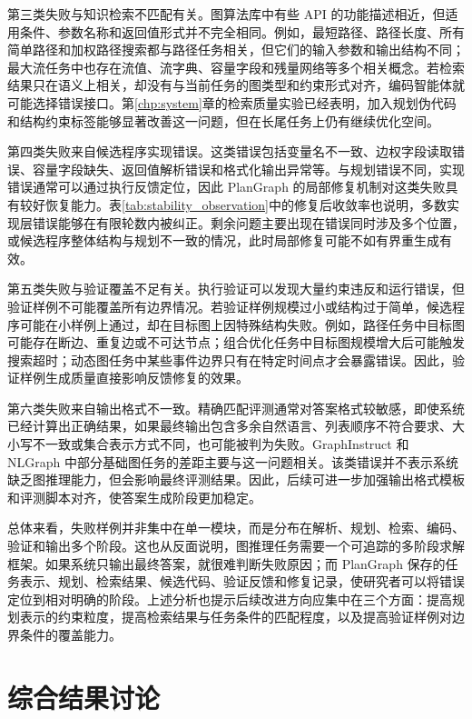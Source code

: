 第三类失败与知识检索不匹配有关。图算法库中有些 API 的功能描述相近，但适用条件、参数名称和返回值形式并不完全相同。例如，最短路径、路径长度、所有简单路径和加权路径搜索都与路径任务相关，但它们的输入参数和输出结构不同；最大流任务中也存在流值、流字典、容量字段和残量网络等多个相关概念。若检索结果只在语义上相关，却没有与当前任务的图类型和约束形式对齐，编码智能体就可能选择错误接口。第\ref{chp:system}章的检索质量实验已经表明，加入规划伪代码和结构约束标签能够显著改善这一问题，但在长尾任务上仍有继续优化空间。

第四类失败来自候选程序实现错误。这类错误包括变量名不一致、边权字段读取错误、容量字段缺失、返回值解析错误和格式化输出异常等。与规划错误不同，实现错误通常可以通过执行反馈定位，因此 PlanGraph 的局部修复机制对这类失败具有较好恢复能力。表\ref{tab:stability_observation}中的修复后收敛率也说明，多数实现层错误能够在有限轮数内被纠正。剩余问题主要出现在错误同时涉及多个位置，或候选程序整体结构与规划不一致的情况，此时局部修复可能不如有界重生成有效。

第五类失败与验证覆盖不足有关。执行验证可以发现大量约束违反和运行错误，但验证样例不可能覆盖所有边界情况。若验证样例规模过小或结构过于简单，候选程序可能在小样例上通过，却在目标图上因特殊结构失败。例如，路径任务中目标图可能存在断边、重复边或不可达节点；组合优化任务中目标图规模增大后可能触发搜索超时；动态图任务中某些事件边界只有在特定时间点才会暴露错误。因此，验证样例生成质量直接影响反馈修复的效果。

第六类失败来自输出格式不一致。精确匹配评测通常对答案格式较敏感，即使系统已经计算出正确结果，如果最终输出包含多余自然语言、列表顺序不符合要求、大小写不一致或集合表示方式不同，也可能被判为失败。GraphInstruct 和 NLGraph 中部分基础图任务的差距主要与这一问题相关。该类错误并不表示系统缺乏图推理能力，但会影响最终评测结果。因此，后续可进一步加强输出格式模板和评测脚本对齐，使答案生成阶段更加稳定。

总体来看，失败样例并非集中在单一模块，而是分布在解析、规划、检索、编码、验证和输出多个阶段。这也从反面说明，图推理任务需要一个可追踪的多阶段求解框架。如果系统只输出最终答案，就很难判断失败原因；而 PlanGraph 保存的任务表示、规划、检索结果、候选代码、验证反馈和修复记录，使研究者可以将错误定位到相对明确的阶段。上述分析也提示后续改进方向应集中在三个方面：提高规划表示的约束粒度，提高检索结果与任务条件的匹配程度，以及提高验证样例对边界条件的覆盖能力。

\section{综合结果讨论}

